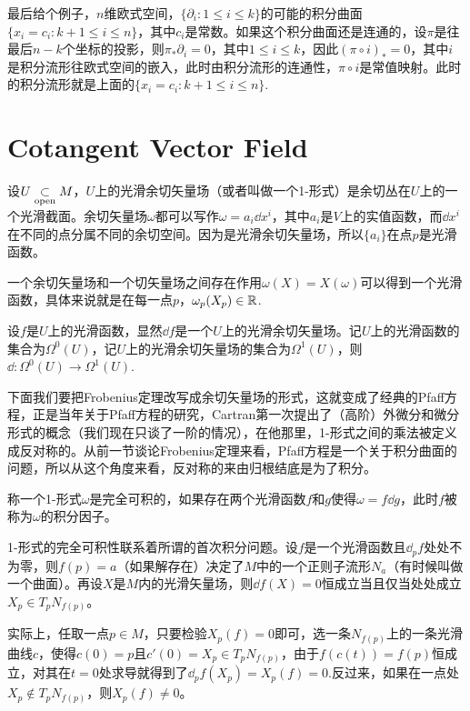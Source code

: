 最后给个例子，$n$维欧式空间，$\{\partial_i:1\leq i \leq k\}$的可能的积分曲面$\{x_i=c_i:k+1\leq i \leq n\}$，其中$c_i$是常数。如果这个积分曲面还是连通的，设$\pi$是往最后$n-k$个坐标的投影，则$\pi_*\partial_i=0$，其中$1\leq i \leq k$，因此$(\pi\circ i)_*=0$，其中$i$是积分流形往欧式空间的嵌入，此时由积分流形的连通性，$\pi\circ i$是常值映射。此时的积分流形就是上面的$\{x_i=c_i:k+1\leq i \leq n\}$.

\section{Cotangent Vector Field}

\para 设$U\underset{\mathrm{open}}{\subset} M$，$U$上的光滑余切矢量场（或者叫做一个1-形式）是余切丛在$U$上的一个光滑截面。余切矢量场$\omega$都可以写作$\omega=a_i\dd x^i$，其中$a_i$是$V$上的实值函数，而$\dd x^i$在不同的点分属不同的余切空间。因为是光滑余切矢量场，所以$\{a_i\}$在点$p$是光滑函数。

一个余切矢量场和一个切矢量场之间存在作用$\omega(X)=X(\omega)$可以得到一个光滑函数，具体来说就是在每一点$p$，$\omega_p(X_p)\in \mathbb{R}$.


\para 设$f$是$U$上的光滑函数，显然$\dd f$是一个$U$上的光滑余切矢量场。记$U$上的光滑函数的集合为$\Omega^0(U)$，记$U$上的光滑余切矢量场的集合为$\Omega^1(U)$，则$\dd: \Omega^0(U)\to \Omega^1(U)$.

下面我们要把Frobenius定理改写成余切矢量场的形式，这就变成了经典的Pfaff方程，正是当年关于Pfaff方程的研究，Cartran第一次提出了（高阶）外微分和微分形式的概念（我们现在只谈了一阶的情况），在他那里，1-形式之间的乘法被定义成反对称的。从前一节谈论Frobenius定理来看，Pfaff方程是一个关于积分曲面的问题，所以从这个角度来看，反对称的来由归根结底是为了积分。

\para 称一个1-形式$\omega$是完全可积的，如果存在两个光滑函数$f$和$g$使得$\omega=f\dd g$，此时$f$被称为$\omega$的积分因子。

1-形式的完全可积性联系着所谓的首次积分问题。设$f$是一个光滑函数且$\dd_p f$处处不为零，则$f(p)=a$（如果解存在）决定了$M$中的一个正则子流形$N_a$（有时候叫做一个曲面）。再设$X$是$M$内的光滑矢量场，则$\dd f(X)=0$恒成立当且仅当处处成立$X_p\in T_pN_{f(p)}$。

实际上，任取一点$p\in M$，只要检验$X_p(f)=0$即可，选一条$N_{f(p)}$上的一条光滑曲线$c$，使得$c(0)=p$且$c'(0)=X_p\in T_pN_{f(p)}$，由于$f(c(t))=f(p)$恒成立，对其在$t=0$处求导就得到了$\dd_pf(X_p)=X_p(f)=0$.反过来，如果在一点处$X_p\notin T_pN_{f(p)}$，则$X_p(f)\neq 0$。

